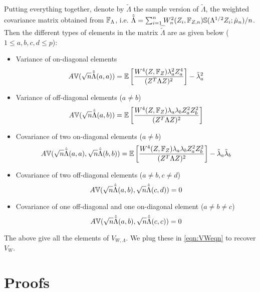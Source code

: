 \paragraph{}Putting everything together, denote by $\hat {\tilde \Lambda}$ the sample version of $\tilde \Lambda$, the weighted covariance matrix obtained from ${\mathbb{F}}_\Lambda$, i.e. $\hat {\tilde \Lambda} = \sum_{i=1}^n W_n^2 (Z_i, {\mathbb{F}}_{Z,n}) {\mathbb{S}}( \Lambda^{1/2} Z_i; \hat \mu_n)/n $. Then the different types of elements in the matrix $\hat {\tilde \Lambda}$ are as given below ($1 \leq a,b,c,d \leq p$):

\begin{itemize}
\item Variance of on-diagonal elements
%
$$ A{\mathbb{V}}( \sqrt n \hat {\tilde \Lambda} (a,a) ) = {\mathbb{E}} \left[ \frac{ W^4(Z, {\mathbb{F}}_Z) \lambda_a^2 Z_a^4}{(Z^T \Lambda Z)^2} \right] - \tilde\lambda_a^2 $$

\item Variance of off-diagonal elements ($a \neq b$)
%
$$ A{\mathbb{V}}( \sqrt n \hat {\tilde \Lambda} (a,b) ) = {\mathbb{E}} \left[ \frac{W^4 (Z, {\mathbb{F}}_Z) \lambda_a \lambda_b Z_a^2 Z_b^2}{(Z^T \Lambda Z)^2} \right] $$

\item Covariance of two on-diagonal elements ($a \neq b$)
%
$$ A{\mathbb{V}}(\sqrt n \hat {\tilde \Lambda} (a,a), \sqrt n \hat {\tilde \Lambda} (b,b) )
= {\mathbb{E}} \left[ \frac{W^4 (Z, {\mathbb{F}}_Z) \lambda_a \lambda_b Z_a^2 Z_b^2}{(Z^T \Lambda Z)^2} \right] - \tilde\lambda_{a} \tilde\lambda_{b} $$

\item Covariance of two off-diagonal elements ($a \neq b, c \neq d$)
%
$$ A{\mathbb{V}}(\sqrt n \hat {\tilde \Lambda} (a,b), \sqrt n \hat {\tilde \Lambda} (c,d) ) = 0 $$

\item Covariance of one off-diagonal and one on-diagonal element ($a \neq b \neq c$)
%
$$ A{\mathbb{V}}(\sqrt n \hat {\tilde \Lambda} (a,b), \sqrt n \hat {\tilde \Lambda} (c,c) ) = 0 $$
\end{itemize}

\noindent The above give all the elements of $V_{W,\Lambda}$. We plug these in \eqref{eqn:VWeqn} to recover $V_W$.

\section{Proofs}\label{section:appB}

